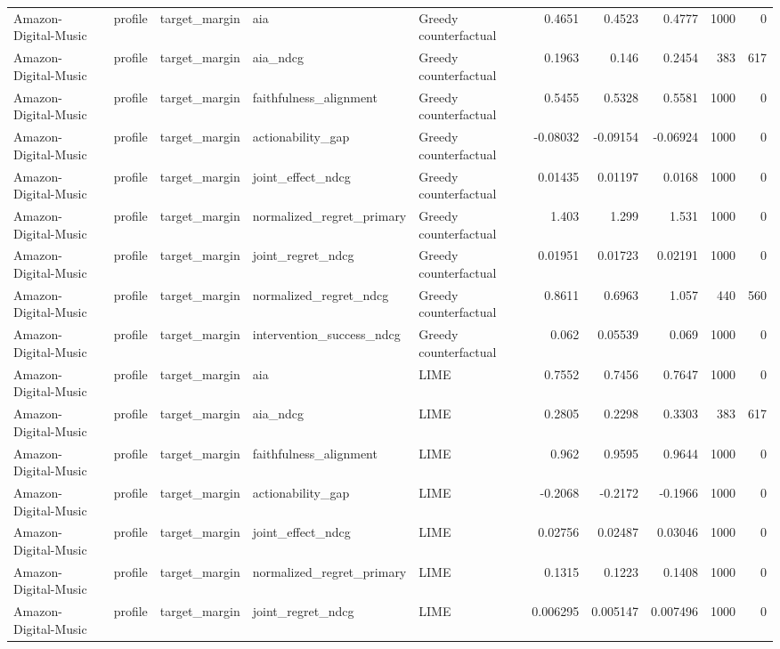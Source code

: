 \begin{table}[t]
\begin{tabular}{lllllrrrrr}
Amazon-Digital-Music & profile & target\_margin & aia & Greedy counterfactual & 0.4651 & 0.4523 & 0.4777 & 1000 & 0 \\
Amazon-Digital-Music & profile & target\_margin & aia\_ndcg & Greedy counterfactual & 0.1963 & 0.146 & 0.2454 & 383 & 617 \\
Amazon-Digital-Music & profile & target\_margin & faithfulness\_alignment & Greedy counterfactual & 0.5455 & 0.5328 & 0.5581 & 1000 & 0 \\
Amazon-Digital-Music & profile & target\_margin & actionability\_gap & Greedy counterfactual & -0.08032 & -0.09154 & -0.06924 & 1000 & 0 \\
Amazon-Digital-Music & profile & target\_margin & joint\_effect\_ndcg & Greedy counterfactual & 0.01435 & 0.01197 & 0.0168 & 1000 & 0 \\
Amazon-Digital-Music & profile & target\_margin & normalized\_regret\_primary & Greedy counterfactual & 1.403 & 1.299 & 1.531 & 1000 & 0 \\
Amazon-Digital-Music & profile & target\_margin & joint\_regret\_ndcg & Greedy counterfactual & 0.01951 & 0.01723 & 0.02191 & 1000 & 0 \\
Amazon-Digital-Music & profile & target\_margin & normalized\_regret\_ndcg & Greedy counterfactual & 0.8611 & 0.6963 & 1.057 & 440 & 560 \\
Amazon-Digital-Music & profile & target\_margin & intervention\_success\_ndcg & Greedy counterfactual & 0.062 & 0.05539 & 0.069 & 1000 & 0 \\
Amazon-Digital-Music & profile & target\_margin & aia & LIME & 0.7552 & 0.7456 & 0.7647 & 1000 & 0 \\
Amazon-Digital-Music & profile & target\_margin & aia\_ndcg & LIME & 0.2805 & 0.2298 & 0.3303 & 383 & 617 \\
Amazon-Digital-Music & profile & target\_margin & faithfulness\_alignment & LIME & 0.962 & 0.9595 & 0.9644 & 1000 & 0 \\
Amazon-Digital-Music & profile & target\_margin & actionability\_gap & LIME & -0.2068 & -0.2172 & -0.1966 & 1000 & 0 \\
Amazon-Digital-Music & profile & target\_margin & joint\_effect\_ndcg & LIME & 0.02756 & 0.02487 & 0.03046 & 1000 & 0 \\
Amazon-Digital-Music & profile & target\_margin & normalized\_regret\_primary & LIME & 0.1315 & 0.1223 & 0.1408 & 1000 & 0 \\
Amazon-Digital-Music & profile & target\_margin & joint\_regret\_ndcg & LIME & 0.006295 & 0.005147 & 0.007496 & 1000 & 0 \\

\end{tabular}
\end{table}

